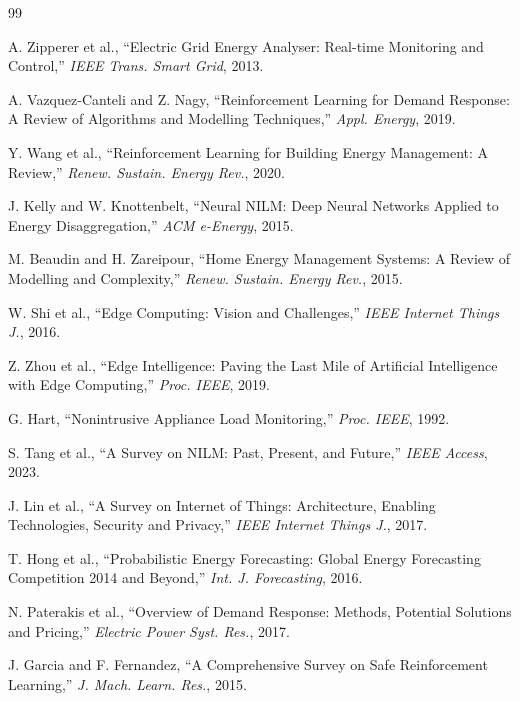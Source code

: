 \documentclass[11pt,a4paper]{article}
\begin{document}

\begin{thebibliography}{99}

A. Zipperer et al., ``Electric Grid Energy Analyser: Real-time Monitoring and Control,'' \textit{IEEE Trans. Smart Grid}, 2013.

A. Vazquez-Canteli and Z. Nagy, ``Reinforcement Learning for Demand Response: A Review of Algorithms and Modelling Techniques,'' \textit{Appl. Energy}, 2019.

Y. Wang et al., ``Reinforcement Learning for Building Energy Management: A Review,'' \textit{Renew. Sustain. Energy Rev.}, 2020.

J. Kelly and W. Knottenbelt, ``Neural NILM: Deep Neural Networks Applied to Energy Disaggregation,'' \textit{ACM e-Energy}, 2015.

M. Beaudin and H. Zareipour, ``Home Energy Management Systems: A Review of Modelling and Complexity,'' \textit{Renew. Sustain. Energy Rev.}, 2015.

W. Shi et al., ``Edge Computing: Vision and Challenges,'' \textit{IEEE Internet Things J.}, 2016.

Z. Zhou et al., ``Edge Intelligence: Paving the Last Mile of Artificial Intelligence with Edge Computing,'' \textit{Proc. IEEE}, 2019.

G. Hart, ``Nonintrusive Appliance Load Monitoring,'' \textit{Proc. IEEE}, 1992.

S. Tang et al., ``A Survey on NILM: Past, Present, and Future,'' \textit{IEEE Access}, 2023.

J. Lin et al., ``A Survey on Internet of Things: Architecture, Enabling Technologies, Security and Privacy,'' \textit{IEEE Internet Things J.}, 2017.

T. Hong et al., ``Probabilistic Energy Forecasting: Global Energy Forecasting Competition 2014 and Beyond,'' \textit{Int. J. Forecasting}, 2016.

N. Paterakis et al., ``Overview of Demand Response: Methods, Potential Solutions and Pricing,'' \textit{Electric Power Syst. Res.}, 2017.

J. Garcia and F. Fernandez, ``A Comprehensive Survey on Safe Reinforcement Learning,'' \textit{J. Mach. Learn. Res.}, 2015.


\end{thebibliography}
\end{document}
